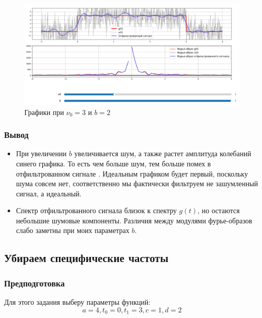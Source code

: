 \documentclass[a4paper,12pt]{article}
\begin{document}
\begin{figure}[H]  
    \centering
    \includegraphics[width=1\textwidth]{../images/1.1_2_3.png}
    \caption{Графики при \(\nu_0 = 3\) и \(b = 2\)}  
    \label{fig:my_image}  
\end{figure}

\subsubsection{Вывод}

\begin{itemize}
    \item При увеличении \(b\) увеличивается шум, а также растет амплитуда колебаний
    синего графика. То есть чем больше шум, тем больше помех в отфильтрованном сигнале
    . Идеальным графиком будет первый, поскольку шума совсем нет, 
    соответственно мы фактически фильтруем не зашумленный сигнал, а идеальный.

    \item Спектр отфильтрованного сигнала близок к спектру \(g(t)\), но остаются небольшие шумовые компоненты.
    Различия между модулями фурье-образов слабо заметны при моих параметрах \(b\).

\end{itemize}





\subsection{Убираем специфические частоты}

\subsubsection{Предподготовка}

Для этого задания выберу параметры функций:
\[
a = 4, t_0 = 0, t_1 = 3, c = 1, d = 2
\]
\end{document}
